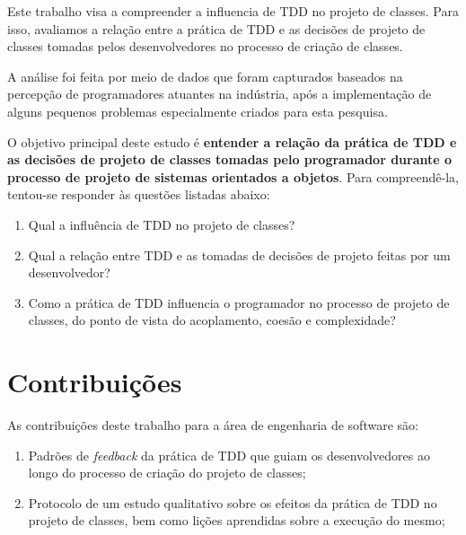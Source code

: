 Este trabalho
visa a compreender a influencia de TDD no projeto de classes.
Para isso, avaliamos a relação entre a prática de 
TDD
e as decisões de projeto de classes tomadas pelos desenvolvedores no processo de 
criação de classes.

A análise foi feita por meio de dados que foram
capturados baseados na percepção de programadores atuantes na indústria, após
a implementação de alguns pequenos problemas especialmente criados para
esta pesquisa.

O objetivo principal deste estudo é \textbf{entender a relação da prática de TDD 
e as decisões de projeto de classes tomadas pelo programador durante o processo de 
projeto de sistemas orientados a objetos}.
Para compreendê-la, tentou-se responder às questões listadas
abaixo:

\begin{enumerate}

	\item Qual a influência de TDD no projeto de classes?

	\item Qual a relação entre TDD e as tomadas de decisões de projeto
	feitas por um desenvolvedor?

	\item Como a prática de TDD influencia o programador no processo de  
	projeto de classes, do ponto de vista do acoplamento, coesão e complexidade?

\end{enumerate}

\section{Contribuições}

As contribuições deste trabalho para a área de engenharia de software
são:

\begin{enumerate}
	\item Padrões de \textit{feedback} da prática de TDD que guiam os desenvolvedores
	ao longo do processo de criação do projeto de classes;

	\item Protocolo de um estudo qualitativo sobre os efeitos da prática
	de TDD no projeto de classes, bem como lições aprendidas sobre a execução do mesmo;
		
\end{enumerate}

